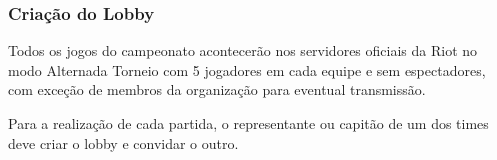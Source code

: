 \subsubsection{Criação do Lobby}

Todos os jogos do campeonato acontecerão nos servidores oficiais da Riot no modo Alternada Torneio com 5 jogadores em cada equipe e sem espectadores, com exceção de membros da organização para eventual transmissão.

Para a realização de cada partida, o representante ou capitão de um dos times deve criar o lobby e convidar o outro.
